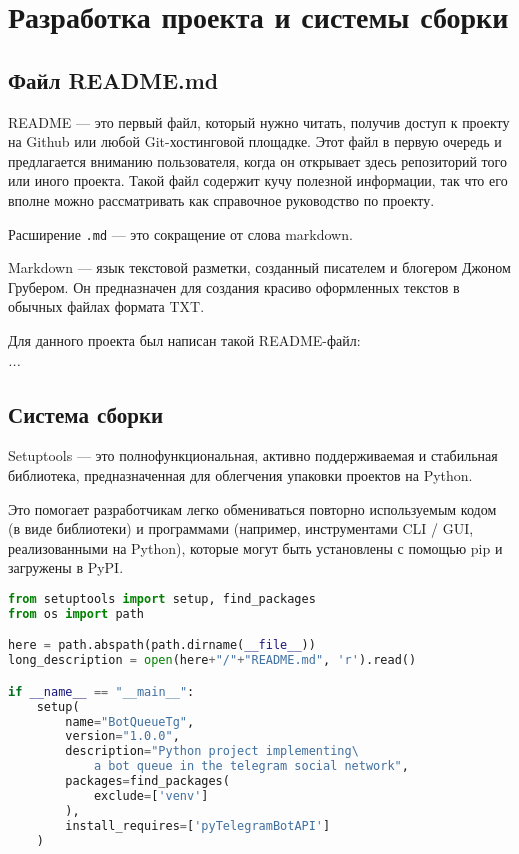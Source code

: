 \graphicspath{{./img/}} %

\chapter{Разработка проекта и системы сборки}
\section{Файл README.md}
README --- это первый файл, который нужно читать, получив доступ к проекту
на Github или любой Git-хостинговой площадке. Этот файл в первую очередь
и предлагается вниманию пользователя, когда он открывает здесь репозиторий
того или иного проекта. Такой файл содержит кучу полезной информации, так что
его вполне можно рассматривать как справочное руководство по проекту.\par
Расширение \texttt{.md} --- это сокращение от слова markdown.\par
Markdown — язык текстовой разметки, созданный писателем и блогером
Джоном Грубером. Он предназначен для создания красиво оформленных текстов
в обычных файлах формата TXT.\par
Для данного проекта был написан такой README-файл:\\
\textit{...}

\section{Система сборки}
Setuptools --- это полнофункциональная, активно поддерживаемая
и стабильная библиотека, предназначенная для облегчения упаковки
проектов на Python.

Это помогает разработчикам легко обмениваться повторно используемым кодом
(в виде библиотеки) и программами (например, инструментами CLI / GUI,
реализованными на Python), которые могут быть установлены с помощью pip
и загружены в PyPI.

\begin{lstlisting}[language=Python
	, caption=\leftline{Текст файла setup.py}
	, label=lst:setup]
from setuptools import setup, find_packages
from os import path

here = path.abspath(path.dirname(__file__))
long_description = open(here+"/"+"README.md", 'r').read()

if __name__ == "__main__":
	setup(
		name="BotQueueTg",
		version="1.0.0",
		description="Python project implementing\
			a bot queue in the telegram social network",
		packages=find_packages(
			exclude=['venv']
		),
		install_requires=['pyTelegramBotAPI']
	)
\end{lstlisting}


